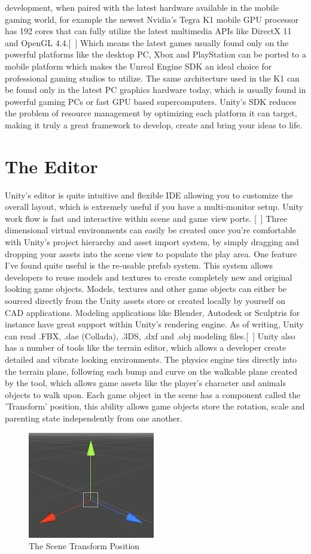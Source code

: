 development, when paired with the latest hardware available in the mobile gaming world, for example the newest Nvidia’s Tegra K1 mobile GPU processor has 192 cores that can fully utilize the latest multimedia APIs like DirectX 11 and OpenGL 4.4.[~\cite{Nvidia-K1}] Which means the latest games usually found only on the powerful platforms like the desktop PC, Xbox and PlayStation can be ported to a mobile platform which makes the Unreal Engine SDK an ideal choice for professional gaming studios to utilize. The same architecture used in the K1 can be found only in the latest PC graphics hardware today, which is usually found in powerful gaming PCs or fast GPU based supercomputers. Unity's SDK reduces the problem of resource management by optimizing each platform it can target, making it truly a great framework to develop, create and bring your ideas to life.
\section{The Editor}
Unity's editor is quite intuitive and flexible IDE allowing you to customize the overall layout, which is extremely useful if you have a multi-monitor setup. Unity work flow is fast and interactive within scene and game view ports. [~\cite{The-Editor}] Three dimensional virtual environments can easily be created once you're comfortable with Unity's project hierarchy and asset import system, by simply dragging and dropping your assets into the scene view to populate the play area. One feature I've found quite useful is the re-usable prefab system. This system allows developers to reuse models and textures to create completely new and original looking game objects. Models, textures and other game objects can either be sourced directly from the Unity assets store or created locally by yourself on CAD applications. Modeling applications like Blender, Autodesk or Sculptris for instance have great support within Unity's rendering engine. As of writing, Unity can read .FBX, .dae (Collada), .3DS, .dxf and .obj modeling files.[~\cite{Unity-Models-Support}] Unity also has a number of tools like the terrain editor, which allows a developer create detailed and vibrate looking environments. The physics engine ties directly into the terrain plane, following each bump and curve on the walkable plane created by the tool, which allows game assets like the player's character and animals objects to walk upon. Each game object in the scene has a component called the 'Transform' position, this ability allows game objects store the rotation, scale and parenting state independently from one another. 
\begin{figure}[!ht]
	\caption{The Scene Transform Position}
	\centering
	\includegraphics{img/transform.jpg}
\end{figure}
